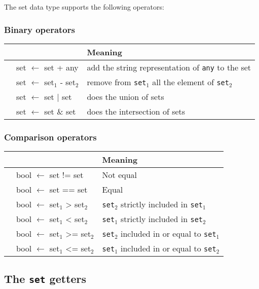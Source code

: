 \documentclass[10pt,openright,twosides]{report}
\newcommand{\gtltype}[1]{{\small\ttfamily #1}}
\begin{document}
The \gtltype{set} data type supports the following operators:

\subsubsection{Binary operators}

\begin{longtable}{>{\ttfamily}l|>{\ttfamily}l|l}
{\bf Operator}&{\bf Expression type}&{\bf Meaning}\\
\hline\endhead
 {+}&
  {set $\leftarrow$ set + any}&
  {add the string representation of \texttt{any} to the set}\\
 {-}&
  {set $\leftarrow$ set$_1$ - set$_2$}&
  {remove from \texttt{set$_1$} all the element of \texttt{set$_2$}}\\
 {|}&
  {set $\leftarrow$ set | set}&
  {does the union of sets}\\
 {\&}&
  {set $\leftarrow$ set \& set}&
  {does the intersection of sets}\\
\end{longtable}

\subsubsection{Comparison operators}

\begin{longtable}{>{\ttfamily}l|>{\ttfamily}l|l}
{\bf Operator}&{\bf Expression type}&{\bf Meaning}\\
\hline\endhead
 {!=}&
  {bool $\leftarrow$ set != set}&
  {Not equal}\\
 {==}&
  {bool $\leftarrow$ set == set}&
  {Equal}\\
 {>}&
  {bool $\leftarrow$ set$_1$ > set$_2$}&
  {\texttt{set$_2$} strictly included in \texttt{set$_1$}}\\
 {<}&
  {bool $\leftarrow$ set$_1$ < set$_2$}&
  {\texttt{set$_1$} strictly included in \texttt{set$_2$}}\\
 {>=}&
  {bool $\leftarrow$ set$_1$ >= set$_2$}&
  {\texttt{set$_2$} included in or equal to \texttt{set$_1$}}\\
 {<=}&
  {bool $\leftarrow$ set$_1$ <= set$_2$}&
  {\texttt{set$_1$} included in or equal to \texttt{set$_2$}}\\
\end{longtable}

\subsection{The \texttt{set} getters}
\end{document}
